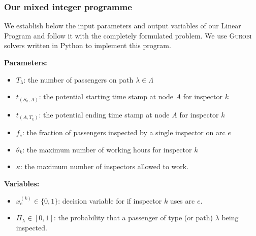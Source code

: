 \documentclass[11pt]{article}
\begin{document}
\subsubsection{Our mixed integer programme}

We establish below the input parameters and output variables of 
our Linear Program and follow it with the completely formulated problem. 
We use \textsc{Gurobi} solvers written in Python to implement this program.

\textbf{Parameters:}
\begin{itemize}\itemsep -2pt
    \item $T_\lambda$: the number of passengers on path $\lambda\in\Lambda$
    \item $t_{(S_k,A)}$: the potential starting time stamp at node $A$ for inspector $k$
    \item $t_{(A,T_k)}$: the potential ending time stamp at node $A$ for inspector $k$
    \item $f_e$: the fraction of passengers inspected by a single inspector on arc $e$
    \item $\theta_k$: the maximum number of working hours for inspector $k$
    \item $\kappa$: the maximum number of inspectors allowed to work.
\end{itemize}

\textbf{Variables:}
\begin{itemize}\itemsep -2pt
    \item $x_e^{(k)}\in\{0,1\}$: decision variable for if inspector $k$ uses arc $e$.
    \item $\Pi_\lambda\in [0,1]$: the probability that a passenger of type (or path) $\lambda$ being inspected.
\end{itemize}
\end{document}
